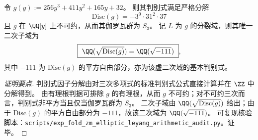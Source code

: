 \begin{conclusion}\label{con:xi-terminal-zm-leyang-cubic-arithmetic}
令
\(
g(y):=256y^3+411y^2+165y+32
\)。
则其判别式满足严格分解
\[
\boxed{\;\mathrm{Disc}(g)=-3^{9}\cdot 31^{2}\cdot 37\;}
\]
且 \(g\) 在 \(\QQ[y]\) 上不可约，从而其伽罗瓦群为 \(S_3\)。
记 \(L\) 为 \(g\) 的分裂域，则其唯一二次子域为
\[
\boxed{\ \QQ(\sqrt{\mathrm{Disc}(g)})=\QQ(\sqrt{-111})\ },
\]
其中 \(-111\) 为 \(\mathrm{Disc}(g)\) 的平方自由部分，亦为该虚二次域的基本判别式。
\end{conclusion}
\begin{proof}[证明要点]
判别式因子分解由对三次多项式的标准判别式公式直接计算并在 \(\ZZ\) 中分解得到。
由有理根判据可排除 \(g\) 的有理根，从而 \(g\) 不可约；对不可约三次而言，判别式非平方当且仅当伽罗瓦群为 \(S_3\)。
二次子域由 \(\QQ(\sqrt{\mathrm{Disc}(g)})\) 给出；由于 \(\mathrm{Disc}(g)\) 的平方自由部分为 \(-111\)，故该二次域为 \(\QQ(\sqrt{-111})\)。
可复现核验脚本：\texttt{scripts/exp\_fold\_zm\_elliptic\_leyang\_arithmetic\_audit.py}。证毕。
\end{proof}

